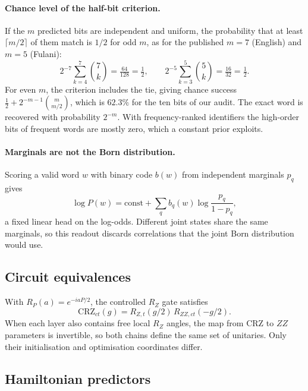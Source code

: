 \documentclass[11pt,a4paper]{article}
\begin{document}
  \paragraph{Chance level of the half-bit criterion.}
  If the $m$ predicted bits are independent and uniform, the probability that at least $\lceil m/2\rceil$ of them match is $1/2$ for odd $m$, as for the published $m=7$ (English) and $m=5$ (Fulani):
  \begin{equation}
    2^{-7}\textstyle\sum_{k=4}^{7}\binom{7}{k}=\tfrac{64}{128}=\tfrac12,\qquad 2^{-5}\sum_{k=3}^{5}\binom{5}{k}=\tfrac{16}{32}=\tfrac12.
  \end{equation}
  For even $m$, the criterion includes the tie, giving chance success $\tfrac12+2^{-m-1}\binom{m}{m/2}$, which is $62.3\%$ for the ten bits of our audit. The exact word is recovered with probability $2^{-m}$. With frequency-ranked identifiers the high-order bits of frequent words are mostly zero, which a constant prior exploits.

  \paragraph{Marginals are not the Born distribution.}
  Scoring a valid word $w$ with binary code $b(w)$ from independent marginals $p_q$ gives
  \begin{equation}
    \log P(w)=\mathrm{const}+\textstyle\sum_q b_q(w)\log\frac{p_q}{1-p_q},
  \end{equation}
  a fixed linear head on the log-odds. Different joint states share the same marginals, so this readout discards correlations that the joint Born distribution would use.

  \subsection{Circuit equivalences}
  \label{app:circuits}
  With $R_P(a)=e^{-iaP/2}$, the controlled $R_Z$ gate satisfies
  \begin{equation}
    \mathrm{CRZ}_{ct}(g)=R_{Z,t}(g/2)\,R_{ZZ,ct}(-g/2).
  \end{equation}
  When each layer also contains free local $R_Z$ angles, the map from CRZ to $ZZ$ parameters is invertible, so both chains define the same set of unitaries. Only their initialisation and optimisation coordinates differ.

  \subsection{Hamiltonian predictors}
  \label{app:ham}
\end{document}
